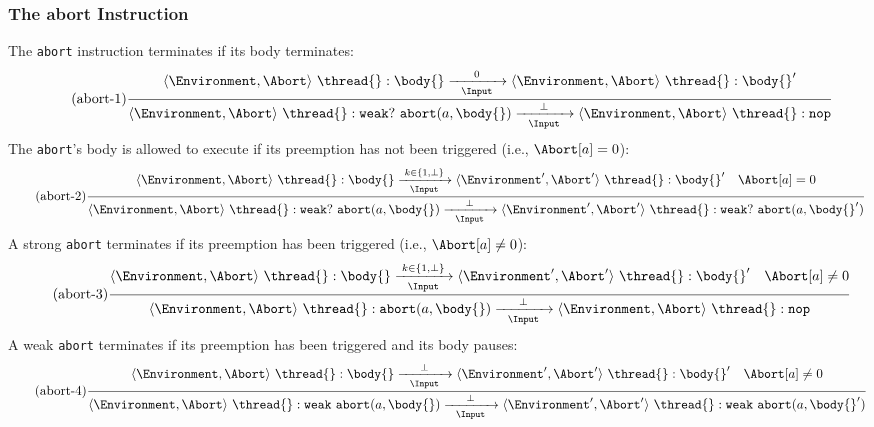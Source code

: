 \subsubsection{The abort Instruction}
The \verb$abort$ instruction terminates if its body \body{} terminates:
\begin{equation*}
	\tag{abort-1}
	\label{forec:abort-1}
	\frac{
			\langle \Environment, \Abort \rangle ~ \thread{}:\body{}
				\xrightarrow[~~\Input~~]{0} 
			\langle \Environment, \Abort \rangle ~ \thread{}:\body{}'
		}{
			\langle \Environment, \Abort \rangle ~ \thread{}:\mathtt{weak}?~\mathtt{abort}(a, \body{})
				\xrightarrow[~~\Input~~]{\bot} 
			\langle \Environment, \Abort \rangle ~ \thread{}:\mathtt{nop}
		}
\end{equation*}
The \verb$abort$'s body is allowed to execute if its preemption 
has not been triggered (i.e., $\Abort[a] = 0$):
\begin{equation*}
	\tag{abort-2}
	\label{forec:abort-2}
	\frac{
			\langle \Environment, \Abort \rangle ~ \thread{}:\body{}
				\xrightarrow[~~\Input~~]{k \in \lbrace 1, \bot \rbrace} 
			\langle \Environment', \Abort' \rangle ~ \thread{}:\body{}'
			\quad
			\Abort[a] = 0
		}{
			\langle \Environment, \Abort \rangle ~ \thread{}:\mathtt{weak}?~\mathtt{abort}(a, \body{})
				\xrightarrow[~~\Input~~]{\bot} 
			\langle \Environment', \Abort' \rangle ~ \thread{}:\mathtt{weak}?~\mathtt{abort}(a, \body{}')
		}
\end{equation*}
A strong \verb$abort$ terminates if its preemption has been triggered (i.e., $\Abort[a] \neq 0$):
\begin{equation*}
	\tag{abort-3}
	\label{forec:abort-3}
	\frac{
			\langle \Environment, \Abort \rangle ~ \thread{}:\body{}
				\xrightarrow[~~\Input~~]{k \in \lbrace 1, \bot \rbrace} 
			\langle \Environment', \Abort' \rangle ~ \thread{}:\body{}'
			\quad
			\Abort[a] \neq 0
		}{
			\langle \Environment, \Abort \rangle ~ \thread{}:\mathtt{abort}(a, \body{})
				\xrightarrow[~~\Input~~]{\bot} 
			\langle \Environment, \Abort \rangle ~ \thread{}:\mathtt{nop}
		}
\end{equation*}
A weak \verb$abort$ terminates if its preemption has been triggered and its body pauses:
\begin{equation*}
	\tag{abort-4}
	\label{forec:abort-4}
	\frac{
			\langle \Environment, \Abort \rangle ~ \thread{}:\body{}
				\xrightarrow[~~\Input~~]{\bot} 
			\langle \Environment', \Abort' \rangle ~ \thread{}:\body{}'
			\quad
			\Abort[a] \neq 0
		}{
			\langle \Environment, \Abort \rangle ~ \thread{}:\mathtt{weak}~\mathtt{abort}(a, \body{})
				\xrightarrow[~~\Input~~]{\bot} 
			\langle \Environment', \Abort' \rangle ~ \thread{}:\mathtt{weak}~\mathtt{abort}(a, \body{}')
		}
\end{equation*}

